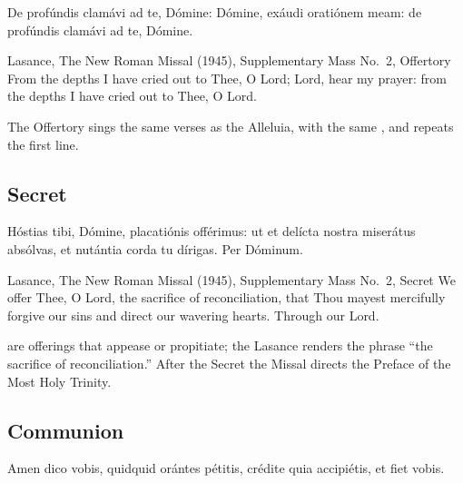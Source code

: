 
\begin{latinproper}
De profúndis clamávi ad te, Dómine: Dómine, exáudi oratiónem meam: de
profúndis clamávi ad te, Dómine.
\end{latinproper}

\begin{englishwitness}{Lasance, The New Roman Missal (1945), Supplementary Mass No.~2, Offertory}
From the depths I have cried out to Thee, O Lord; Lord, hear my prayer: from
the depths I have cried out to Thee, O Lord.
\end{englishwitness}

\noindent The Offertory sings the same verses as the Alleluia, with the same
, and repeats the first line.

\subsection{Secret}
\label{proper-secret}


\begin{latinproper}
Hóstias tibi, Dómine, placatiónis offérimus: ut et delícta nostra miserátus
absólvas, et nutántia corda tu dírigas. Per Dóminum.
\end{latinproper}

\begin{englishwitness}{Lasance, The New Roman Missal (1945), Supplementary Mass No.~2, Secret}
We offer Thee, O Lord, the sacrifice of reconciliation, that Thou mayest
mercifully forgive our sins and direct our wavering hearts. Through our Lord.
\end{englishwitness}

\noindent {} are offerings that appease or
propitiate; the Lasance renders the phrase ``the sacrifice of
reconciliation.'' After the Secret the Missal directs the Preface of the Most
Holy Trinity.

\subsection{Communion}
\label{proper-communion}


\begin{latinproper}
Amen dico vobis, quidquid orántes pétitis, crédite quia accipiétis, et fiet
vobis.
\end{latinproper}

